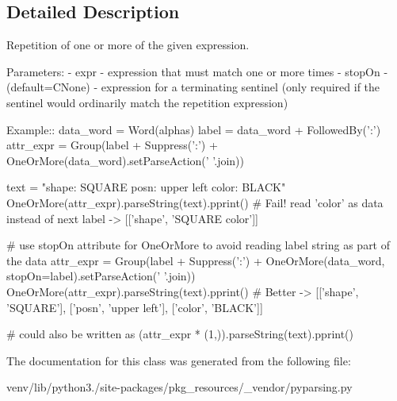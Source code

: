 \subsection{Detailed Description}
\begin{DoxyVerb}Repetition of one or more of the given expression.

Parameters:
 - expr - expression that must match one or more times
 - stopOn - (default=C{None}) - expression for a terminating sentinel
      (only required if the sentinel would ordinarily match the repetition 
      expression)          

Example::
    data_word = Word(alphas)
    label = data_word + FollowedBy(':')
    attr_expr = Group(label + Suppress(':') + OneOrMore(data_word).setParseAction(' '.join))

    text = "shape: SQUARE posn: upper left color: BLACK"
    OneOrMore(attr_expr).parseString(text).pprint()  # Fail! read 'color' as data instead of next label -> [['shape', 'SQUARE color']]

    # use stopOn attribute for OneOrMore to avoid reading label string as part of the data
    attr_expr = Group(label + Suppress(':') + OneOrMore(data_word, stopOn=label).setParseAction(' '.join))
    OneOrMore(attr_expr).parseString(text).pprint() # Better -> [['shape', 'SQUARE'], ['posn', 'upper left'], ['color', 'BLACK']]
    
    # could also be written as
    (attr_expr * (1,)).parseString(text).pprint()
\end{DoxyVerb}
 

The documentation for this class was generated from the following file\+:\begin{DoxyCompactItemize}
\item 
venv/lib/python3./site-\/packages/pkg\+\_\+resources/\+\_\+vendor/pyparsing.\+py\end{DoxyCompactItemize}
